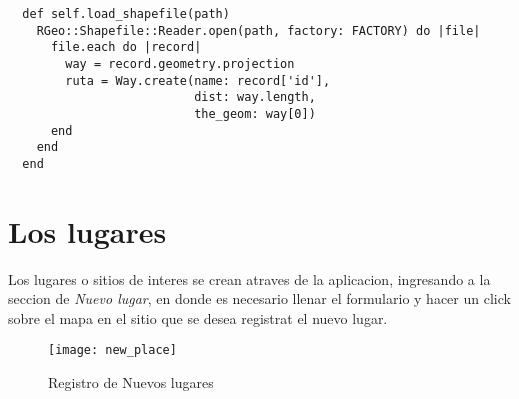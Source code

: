     \begin{center}
      \begin{verbatim}
  def self.load_shapefile(path)
    RGeo::Shapefile::Reader.open(path, factory: FACTORY) do |file|
      file.each do |record|
        way = record.geometry.projection
        ruta = Way.create(name: record['id'],
                          dist: way.length,
                          the_geom: way[0])
      end
    end
  end
      \end{verbatim}
    \end{center}

  \section{Los lugares} %
  \label{sec:los_lugares}
    Los lugares o sitios de interes se crean atraves de la aplicacion, ingresando a la seccion de \emph{Nuevo lugar}, en donde es necesario llenar el formulario y hacer un click sobre el mapa en el sitio que se desea registrat el nuevo lugar.

    \begin{figure}[!ht]
      \begin{center}
        \texttt{[image: new\_place]}
      \end{center}
      \caption{Registro de Nuevos lugares}
      \label{fig:new_place}
    \end{figure}
